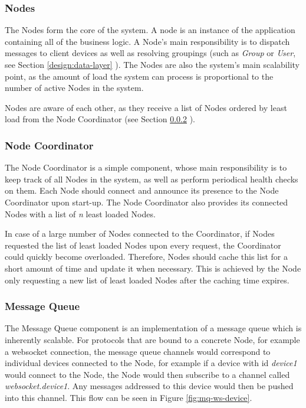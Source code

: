 \subsubsection{Nodes}
The Nodes form the core of the system. A node is an instance of the application containing all of the business logic. A Node's main responsibility is to dispatch messages to client devices as well as resolving groupings (such as \textit{Group} or \textit{User}, see Section \ref{design:data-layer} ). The Nodes are also the system's main scalability point, as the amount of load the system can process is proportional to the number of active Nodes in the system.

Nodes are aware of each other, as they receive a list of Nodes ordered by least load from the Node Coordinator (see Section \ref{design:node-coordinator} ).

\subsubsection{Node Coordinator} \label{design:node-coordinator}
The Node Coordinator is a simple component, whose main responsibility is to keep track of all Nodes in the system, as well as perform periodical health checks on them. Each Node should connect and announce its presence to the Node Coordinator upon start-up. The Node Coordinator also provides its connected Nodes with a list of \textit{n} least loaded Nodes.

In case of a large number of Nodes connected to the Coordinator, if Nodes requested the list of least loaded Nodes upon every request, the Coordinator could quickly become overloaded. Therefore, Nodes should cache this list for a short amount of time and update it when necessary. This is achieved by the Node only requesting a new list of least loaded Nodes after the caching time expires.

\subsubsection{Message Queue} \label{design:messagequeue}
The Message Queue component is an implementation of a message queue which is inherently scalable. For protocols that are bound to a concrete Node, for example a websocket connection, the message queue channels would correspond to individual devices connected to the Node, for example if a device with id \textit{device1} would connect to the Node, the Node would then subscribe to a channel called \textit{websocket.device1}. Any messages addressed to this device would then be pushed into this channel. This flow can be seen in Figure \ref{fig:mq-ws-device}.

